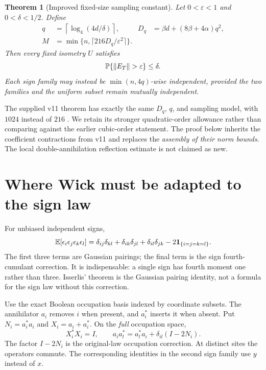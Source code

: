 \documentclass[11pt]{article}
\numberwithin{equation}{section}
\newtheorem{theorem}{Theorem}[section]
\theoremstyle{definition}\newtheorem{definition}[theorem]{Definition}
\theoremstyle{remark}\newtheorem{remark}[theorem]{Remark}
\newcommand{\norm}[1]{\lVert#1\rVert}\newcommand{\ip}[2]{\langle#1,#2\rangle}
\newcommand{\one}{\mathbf1}\newcommand{\F}{\mathbb F}
\begin{document}
\begin{theorem}[Improved fixed-size sampling constant]
\label{thm:main}
Let $0<\varepsilon<1$ and $0<\delta<1/2$. Define
\begin{align}
 q&=\left\lceil\log_4(4d/\delta)\right\rceil,
 &D_q&=\beta d+(8\beta+4\alpha)q^2,\nonumber\\
 M&=\min\{n,\lceil216D_q/\varepsilon^2\rceil\}.
 \label{eq:newM}
\end{align}
Then every fixed isometry $U$ satisfies
\begin{equation}
 \Prob\{\norm{E_T}>\varepsilon\}\le\delta.
 \label{eq:prob}
\end{equation}
Each sign family may instead be $\min(n,4q)$-wise independent, provided the two families and the uniform subset remain mutually independent.
\end{theorem}

The supplied v11 theorem has exactly the same $D_q$, $q$, and sampling model, with $1024$ instead of $216$ \cite[coherent-unitary extension and coefficient-kernel appendix]{Framework}. We retain its stronger quadratic-order allowance rather than comparing against the earlier cubic-order statement. The proof below inherits the coefficient contractions from v11 and replaces the \emph{assembly of their norm bounds}. The local double-annihilation reflection estimate is not claimed as new.

\section{Where Wick must be adapted to the sign law}
\label{sec:law}
For unbiased independent signs,
\begin{equation}
 \E[\epsilon_i\epsilon_j\epsilon_k\epsilon_l]
 =\delta_{ij}\delta_{kl}+\delta_{ik}\delta_{jl}+\delta_{il}\delta_{jk}
       -2\one_{\{i=j=k=l\}}.
 \label{eq:signfour}
\end{equation}
The first three terms are Gaussian pairings; the final term is the sign fourth-cumulant correction. It is indispensable: a single sign has fourth moment one rather than three. Isserlis' theorem \cite{Isserlis} is the Gaussian pairing identity, not a formula for the sign law without this correction.

Use the exact Boolean occupation basis indexed by coordinate subsets. The annihilator $a_i$ removes $i$ when present, and $a_i^*$ inserts it when absent. Put $N_i=a_i^*a_i$ and $X_i=a_i+a_i^*$. On the \emph{full} occupation space,
\begin{equation}
 X_i^*X_i=I,\qquad
 a_i a_l^*=a_l^*a_i+\delta_{il}(I-2N_i).
 \label{eq:boolean}
\end{equation}
The factor $I-2N_i$ is the original-law occupation correction. At distinct sites the operators commute. The corresponding identities in the second sign family use $y$ instead of $x$.
\end{document}
